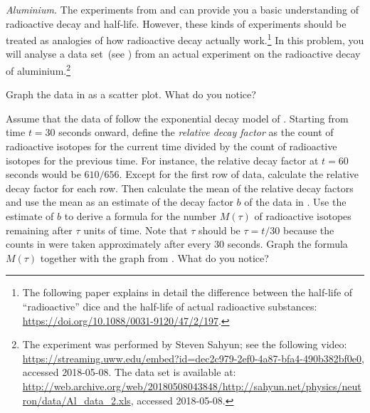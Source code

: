 \documentclass[a4paper,oneside,12pt]{article}
\begin{document}
\begin{problem}
\item\emph{Aluminium.}
  The experiments from  and
   can provide you a basic
  understanding of radioactive decay and half-life.  However, these
  kinds of experiments should be treated as analogies of how
  radioactive decay actually work.\footnote{
    The following paper explains in detail the difference between the
    half-life of ``radioactive'' dice and the half-life of actual
    radioactive substances:
    \url{https://doi.org/10.1088/0031-9120/47/2/197}.
  }
  In this problem, you will analyse a data set~(see
  ) from an actual
  experiment on the radioactive decay of aluminium.\footnote{
    The experiment was performed by Steven Sahyun; see the following
    video:
    \url{https://streaming.uww.edu/embed?id=dec2c979-2ef0-4a87-bfa4-490b382bf0e0},
    accessed 2018-05-08.  The data set is available at:
    \url{http://web.archive.org/web/20180508043848/http://sahyun.net/physics/neutron/data/Al_data_2.xls},
    accessed 2018-05-08.
  }
  \begin{packedenum}
  \item\label{subprob:exponential:aluminium_graph}
    Graph the data in
     as a scatter
    plot.  What do you notice?

  \item\label{subprob:exponential:aluminium_mean_decay_factor}
    Assume that the data of
     follow the
    exponential decay model of
    .  Starting from time
    $t = 30$ seconds onward, define the \emph{relative decay factor}
    as the count of radioactive isotopes for the current time divided
    by the count of radioactive isotopes for the previous time.  For
    instance, the relative decay factor at $t = 60$ seconds would be
    $610 / 656$.  Except for the first row of data, calculate the
    relative decay factor for each row.  Then calculate the mean of
    the relative decay factors and use the mean as an estimate of the
    decay factor $b$ of the data in
    .  Use the
    estimate of $b$ to derive a formula for the number $M(\tau)$ of
    radioactive isotopes remaining after $\tau$ units of time.  Note
    that $\tau$ should be $\tau = t / 30$ because the counts in
     were taken
    approximately after every $30$ seconds.  Graph the formula
    $M(\tau)$ together with the graph
    from .  What do you
    notice?


\end{packedenum}
\end{problem}
\end{document}
